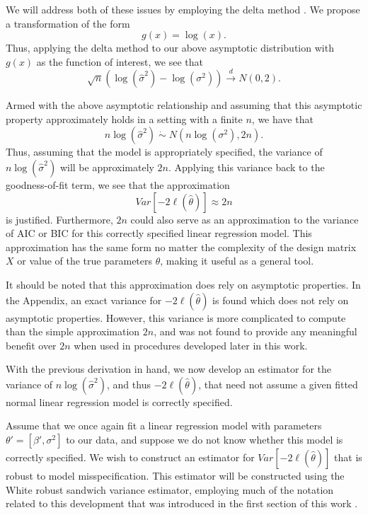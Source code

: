 \documentclass[submit]{smj}
\begin{document}
		We will address both of these issues by employing the delta method \citep{Rao}. We propose a transformation of the form
		\begin{equation*}
			g(x) = \log(x) .
		\end{equation*}
		Thus, applying the delta method to our above asymptotic distribution with $g(x)$ as the function of interest, we see that
		\begin{equation*}
			\sqrt{n} ( \log (\hat{\sigma}^2) - \log(\sigma^2)) \xrightarrow[]{d} N(0, 2) .
		\end{equation*}

		Armed with the above asymptotic relationship and assuming that this asymptotic property approximately holds in a setting with a finite $n$, we have that
		\begin{equation*}
			n\log(\hat{\sigma}^2) \; \dot\sim \; N \left( n\log(\sigma^2), 2n \right) .
		\end{equation*}
		Thus, assuming that the model is appropriately specified, the variance of $n\log(\hat{\sigma}^2)$ will be approximately $2n$. Applying this variance back to the goodness-of-fit term,
		we see that the approximation
		\begin{equation*}
			Var \left[ -2 \ell (\hat{\theta}  ) \right] \approx 2n
		\end{equation*}
		is justified. Furthermore, $2n$ could also serve as an approximation to the variance of AIC or BIC for this correctly specified linear regression model. This approximation
		has the same form no matter the complexity of the design matrix $X$ or value of the true parameters $\theta$, making it useful as a
		general tool.

		It should be noted that this approximation does rely on asymptotic properties. In the Appendix, an exact variance for $-2 \ell (\hat{\theta})$ is found which does
		not rely on asymptotic properties. However, this variance is more complicated to compute than the simple approximation $2n$, and was not found to provide any meaningful
		benefit over $2n$ when used in procedures developed later in this work.

		With the previous derivation in hand, we now develop an estimator for the variance of $n\log(\hat{\sigma}^2)$, and thus $-2 \ell (\hat{\theta})$,
		that need not assume a given fitted normal linear regression model is correctly specified.

		Assume that we once again fit a linear regression model with parameters $\theta' = [\beta', \sigma^2]$ to our data, and suppose we do not know whether this model is correctly specified.
		We wish to construct an estimator for $Var \left[ -2 \ell (\hat{\theta}  ) \right]$ that is robust to model misspecification. This estimator will be constructed using the White robust
		sandwich variance estimator, employing much of the notation related to this development that was introduced in the first section of this work \citep{White1980}.
\end{document}
